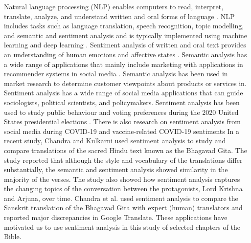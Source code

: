 \documentclass[5p,times]{elsarticle}
\begin{document}
 Natural language processing (NLP) enables computers to read, interpret, translate, analyze, and understand written and oral forms of language \cite{indurkhya2010handbook,manning1999foundations,chowdhury2003natural}.   NLP includes tasks such as language translation, speech recognition, topic modelling, and semantic and sentiment analysis \cite{manning1999foundations} and is typically implemented using machine learning and  deep learning \cite{
otter2020survey,cambria2014jumping,alshemali2020improving}.  Sentiment analysis of written and oral text provides an understanding of human emotions and affective states  \cite{liu2012survey,medhat2014sentiment,hussein2018survey}. Semantic analysis has a wide range of applications that mainly  include marketing with applications in recommender systems in social media \cite{ray2021ensemble,rosa2018knowledge}.  Semantic analysis has been used in market research to determine customer viewpoints about products or services  in\cite{aggarwal2009using, rambocas2017online}.  Sentiment analysis has a wide range of social media applications \cite{yue2019survey} that can guide sociologists, political scientists, and policymakers. Sentiment analysis has been used to study public behaviour and voting preferences during the 2020 United States presidential elections \cite{chandra2021biden}.  There  is also research on sentiment analysis from social media during COVID-19 \cite{nemes2021social} and vaccine-related COVID-19 sentiments %
In a recent study, Chandra and  Kulkarni \cite{chandra2022semantic} used  sentiment analysis  to study and compare translations of the sacred Hindu text known as the Bhagavad Gita. The study reported that although the style and vocabulary of the translations differ substantially, the semantic and sentiment analysis showed similarity in the majority of the verses.  The study also showed how sentiment analysis captures the changing topics of the conversation between the protagonists, Lord Krishna and Arjuna, over time. Chandra et al. \cite{shukla2023evaluation} used sentiment analysis to compare the Sanskrit translation of the Bhagavad Gita with expert (human) translators and reported major discrepancies in Google Translate. These applications have motivated us to use sentiment analysis in this study of selected chapters of the Bible. 


 
\end{document}

